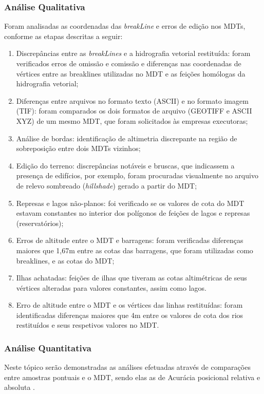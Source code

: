 \documentclass[12pt,a4paper]{article}
\begin{document}
		\subsubsection{Análise Qualitativa}
         Foram analisadas as coordenadas das \textit{breakLine} e erros de edição nos MDTs, conforme as etapas descritas a seguir:
		
		
		\begin{enumerate}
			\item Discrepâncias entre as \textit{breakLines} e a hidrografia vetorial restituída: foram verificados erros de omissão e comissão e diferenças nas coordenadas de vértices entre as breaklines utilizadas no MDT e as feições homólogas da hidrografia vetorial;
			\item Diferenças entre arquivos no formato texto (ASCII) e no formato imagem (TIF): foram comparados os dois formatos de arquivo (GEOTIFF e ASCII XYZ) de um mesmo MDT, que foram solicitados às empresas executoras;
			\item Análise de bordas: identificação de altimetria discrepante na região de sobreposição entre dois MDTs vizinhos;
			\item Edição do terreno: discrepâncias notáveis e bruscas, que indicassem a presença de edifícios, por exemplo, foram procuradas visualmente no arquivo de relevo sombreado (\textit{hillshade}) gerado a partir do MDT;
			\item Represas e lagos não-planos: foi verificado se os valores de cota do MDT estavam constantes no interior dos polígonos de feições de lagos e represas (reservatórios);
			\item Erros de altitude entre o MDT e barragens: foram verificadas diferenças maiores que 1,67m entre as cotas das barragens, que foram utilizadas como breaklines, e as cotas do MDT;
			\item Ilhas achatadas: feições de ilhas que tiveram as cotas altimétricas de seus vértices alteradas para valores constantes, assim como lagos.
			\item Erro de altitude entre o MDT e os vértices das linhas restituídas: foram identificadas diferenças maiores que 4m entre os valores de cota dos rios restituídos e seus respetivos valores no MDT.
		\end{enumerate}
		\subsubsection{Análise Quantitativa}
		Neste tópico serão demonstradas as análises efetuadas através de comparações entre
		amostras pontuais e o MDT, sendo elas as de Acurácia posicional relativa e absoluta \cite{joksic2004elements}.
		
\end{document}
